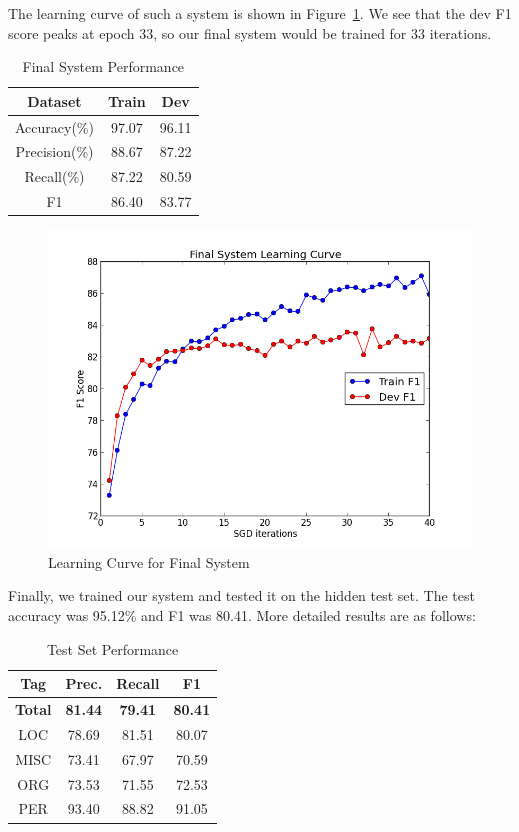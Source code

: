 \documentclass[12pt, twocolumn]{article}
\begin{document}
The learning curve of such a system is shown in Figure~\ref{fig:result}. We see that the dev F1 score peaks at epoch 33, so our final system would be trained for 33 iterations.
\begin{table}[H]
\centering
	\begin{tabular}{|c|c|c|}
		\hline
		Dataset & Train & Dev \\\hline
		Accuracy(\%) & 97.07 & 96.11 \\\hline
		Precision(\%) & 88.67 & 87.22 \\\hline
		Recall(\%)  & 87.22 & 80.59 \\\hline
		F1 & 86.40 & 83.77 \\\hline
	\end{tabular}
	\caption{Final System Performance}
\label{tab:result}
\end{table}
\begin{figure}[H]
\centering
\includegraphics[width = \linewidth]{plots/result}
\caption{Learning Curve for Final System}
\label{fig:result}
\end{figure}
Finally, we trained our system and tested it on the hidden test set. The test accuracy was 95.12\% and F1 was 80.41. More detailed results are as follows:
\begin{table}[H]
\centering
	\begin{tabular}{|c|c|c|c|}
		\hline
		Tag & Prec. & Recall & F1 \\\hline
		\textbf{Total} & \textbf{81.44} & \textbf{79.41} & \textbf{80.41}\\\hline
		LOC & 78.69 & 81.51 & 80.07 \\\hline
		MISC & 73.41 & 67.97 & 70.59 \\\hline
		ORG  & 73.53 & 71.55 & 72.53 \\\hline
		PER & 93.40 & 88.82 & 91.05 \\\hline
	\end{tabular}
	\caption{Test Set Performance}
\label{tab:test}
\end{table}
\end{document}
